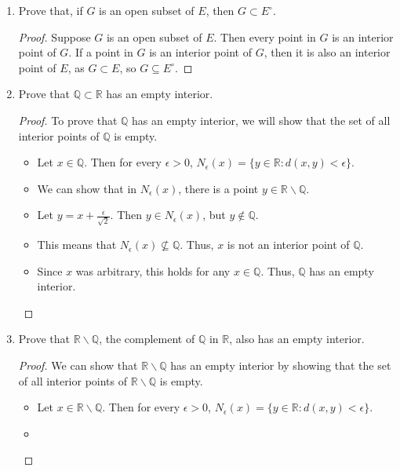 \documentclass[10pt]{article}
\newcommand{\R}{\mathbb{R}}
\newcommand{\Q}{\mathbb{Q}}
\newenvironment{problem}[2][Problem]{\begin{trivlist}
\item[\hskip \labelsep {\bfseries #1}\hskip \labelsep {\bfseries #2.}]}{\end{trivlist}}
\begin{document}
\begin{problem}{4}
\begin{enumerate}
		\item Prove that, if $G$ is an open subset of $E$, then $G \subset E^\circ$.
            \begin{proof}
                Suppose $G$ is an open subset of $E$. Then every point in $G$ is an interior point of $G$. If a point in $G$ is an interior point of $G$, then it is also an interior point of $E$, as $G \subset E$, so $G \subseteq E^\circ$.
            \end{proof}
		\item Prove that $ \Q \subset \R $ has an empty interior.
            \begin{proof}
                To prove that $ \Q $ has an empty interior, we will show that the set of all interior points of $ \Q $ is empty.
                \begin{itemize}
                    \item Let $x \in \Q$.
                Then for every $ \epsilon > 0 $, $N_\epsilon(x) = \{y \in \R : d(x, y) < \epsilon\}$.
                    \item
                We can show that in $N_\epsilon(x)$, there is a point $y \in \R \smallsetminus \Q$.
                    \item
                Let $y = x + \frac{\epsilon}{\sqrt{2}}$. Then $y \in N_\epsilon(x)$, but $y \not\in \Q$.
                    \item
                This means that $N_\epsilon(x) \not\subseteq \Q$. Thus, $x$ is not an interior point of $ \Q $.
                    \item
                Since $x$ was arbitrary, this holds for any $x \in \Q$.
                Thus, $ \Q $ has an empty interior.
                \end{itemize}
            \end{proof}
		\item Prove that $ \R \smallsetminus \Q $, the complement of $ \Q $ in $ \R $, also has an empty interior.
            \begin{proof}
                We can show that $ \R \smallsetminus \Q $ has an empty interior by showing that the set of all interior points of $ \R \smallsetminus \Q $ is empty.
                \begin{itemize}
                    \item
                Let $x \in \R \smallsetminus \Q$.
                Then for every $ \epsilon > 0 $, $N_\epsilon(x) = \{y \in \R : d(x, y) < \epsilon\}$.
                    \item

\end{itemize}
\end{proof}
\end{enumerate}
\end{problem}
\end{document}
